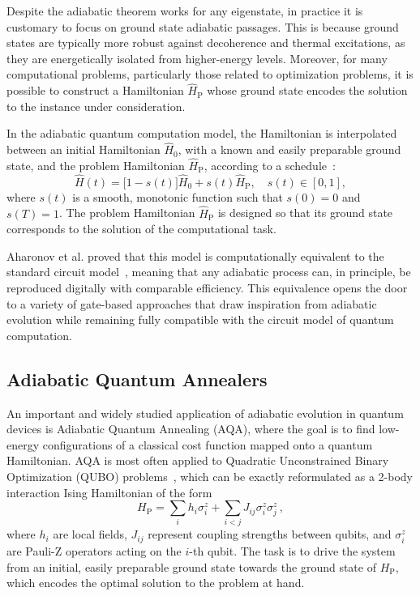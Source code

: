 Despite the adiabatic theorem works for any eigenstate, in practice it is customary to focus on
ground state adiabatic passages. This is because ground states are typically more robust against
decoherence and thermal excitations, as they are energetically isolated from higher-energy levels.
Moreover, for many computational problems, particularly those related to optimization problems,
it is possible to construct a Hamiltonian $\hat{H}_\mathrm{P}$ whose ground state encodes
the solution to the instance under consideration.

In the adiabatic quantum computation model, the Hamiltonian is interpolated between an
initial Hamiltonian $\hat{H}_0$, with a known and easily preparable ground state, and the problem
Hamiltonian $\hat{H}_\mathrm{P}$, according to a schedule~\cite{albash_adiabatic_2018}:
\begin{equation}
    \hat{H}(t) = \big[1 - s(t)\big] \hat{H}_0 + s(t) \hat{H}_\mathrm{P}, \quad s(t) \in [0,1],
    \label{eq:adiabatic_passage}
\end{equation}
where $s(t)$ is a smooth, monotonic function such that $s(0)=0$ and $s(T)=1$. The problem
Hamiltonian $\hat{H}_\mathrm{P}$ is designed so that its ground state corresponds to the solution
of the computational task.

Aharonov et al. proved that this model is computationally equivalent to the standard circuit
model~\cite{aharonov_adiabatic_2004}, meaning that any adiabatic process
can, in principle, be reproduced digitally with comparable efficiency. This equivalence opens
the door to a variety of gate-based approaches that draw inspiration from adiabatic evolution
while remaining fully compatible with the circuit model of quantum computation.

\subsection{Adiabatic Quantum Annealers}
An important and widely studied application of adiabatic evolution in quantum
devices is Adiabatic Quantum Annealing (AQA), where the goal is to find low-energy
configurations of a classical cost function mapped onto a quantum Hamiltonian. AQA is most
often applied to Quadratic Unconstrained Binary Optimization (QUBO) problems~\cite{kadowaki_quantum_1998},
which can be exactly reformulated as a 2-body interaction Ising Hamiltonian of the form
\begin{equation}
    H_\mathrm{P} = \sum_i h_i \sigma_i^z + \sum_{i<j} J_{ij} \sigma_i^z \sigma_j^z\,,
    \label{eq:ising_hamiltonian}
\end{equation}
where $h_i$ are local fields, $J_{ij}$ represent coupling strengths between qubits, and
$\sigma_i^z$ are Pauli-Z operators acting on the $i$-th qubit. The task is to drive the system
from an initial, easily preparable ground state towards the ground state of $H_\mathrm{P}$,
which encodes the optimal solution to the problem at hand.

